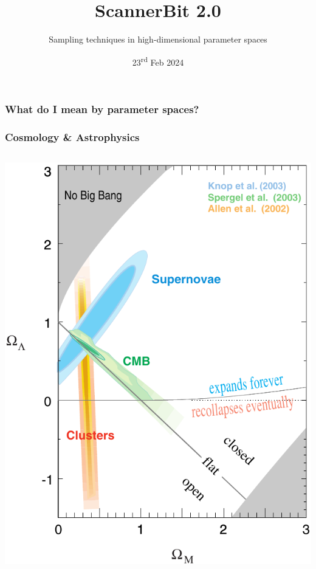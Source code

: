 \documentclass[aspectratio=169]{beamer}
\title{ScannerBit 2.0}
\subtitle{Sampling techniques in high-dimensional parameter spaces}
\date{23\textsuperscript{rd} Feb 2024}
\begin{document}
\begin{frame}
    \titlepage
\end{frame}

\begin{frame}
    \frametitle{What do I mean by parameter spaces?}
\end{frame}

\begin{frame}
    \frametitle{Cosmology \& Astrophysics}
    \begin{columns}
        
        \includegraphics[width=\textwidth]{figures/old_parameters}

\end{columns}
\end{frame}
\end{document}
